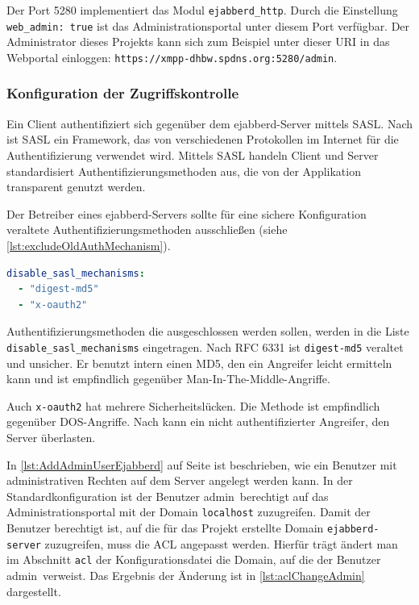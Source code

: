 \documentclass[a4paper,titlepage,halfparskip,12pt]{scrreprt}
\begin{document}
\begin{onehalfspacing}
Der Port 5280 implementiert das Modul \texttt{ejabberd\_http}. Durch die Einstellung \texttt{web\_admin: true} ist das Administrationsportal unter diesem Port verfügbar. Der Administrator dieses Projekts kann sich zum Beispiel unter dieser \ac{URI} in das Webportal einloggen: \texttt{https://xmpp-dhbw.spdns.org:5280/admin}.


\subsubsection*{Konfiguration der Zugriffskontrolle}

Ein Client authentifiziert sich gegenüber dem ejabberd-Server mittels \ac{SASL}. Nach \cite{SASLDescription} ist \ac{SASL} ein Framework, das von verschiedenen Protokollen im Internet für die Authentifizierung verwendet wird. Mittels \ac{SASL} handeln Client und Server standardisiert Authentifizierungsmethoden aus, die von der Applikation transparent genutzt werden.

\pagebreak

Der Betreiber eines ejabberd-Servers sollte für eine sichere Konfiguration veraltete Authentifizierungsmethoden ausschließen (siehe \autoref{lst:excludeOldAuthMechanism}).  

\bigskip

\begin{lstlisting}[language=yaml, caption={Ausschluss unsicherer Authentifizierungsmethoden}, label={lst:excludeOldAuthMechanism}]
disable_sasl_mechanisms:
  - "digest-md5"
  - "x-oauth2"
\end{lstlisting}

Authentifizierungsmethoden die ausgeschlossen werden sollen, werden in die Liste \texttt{disable\_sasl\_mechanisms} eingetragen. Nach \ac{RFC} 6331 ist \texttt{digest-md5} veraltet und unsicher. Er benutzt intern einen \ac{MD5}, den ein Angreifer leicht ermitteln kann und ist empfindlich gegenüber Man-In-The-Middle-Angriffe.\cite{DigestMD5Vulnerabilty}

Auch \texttt{x-oauth2} hat mehrere Sicherheitslücken. Die Methode ist empfindlich gegenüber \ac{DOS}-Angriffe. Nach \cite{xOAuthVulnerabilty} kann ein nicht authentifizierter Angreifer, den Server überlasten.

In \autoref{lst:AddAdminUserEjabberd} auf Seite \pageref{lst:AddAdminUserEjabberd} ist beschrieben, wie ein Benutzer mit administrativen Rechten auf dem Server angelegt werden kann. In der Standardkonfiguration ist der Benutzer \glqq admin\grqq\ berechtigt auf das Administrationsportal mit der Domain \texttt{localhost} zuzugreifen. Damit der Benutzer berechtigt ist, auf die für das Projekt erstellte Domain \texttt{ejabberd-server} zuzugreifen, muss die \ac{ACL} angepasst werden. Hierfür trägt ändert man im Abschnitt \texttt{acl} der Konfigurationsdatei die Domain, auf die der Benutzer \glqq admin\grqq\ verweist. Das Ergebnis der Änderung ist in \autoref{lst:aclChangeAdmin} dargestellt.


\end{onehalfspacing}
\end{document}
